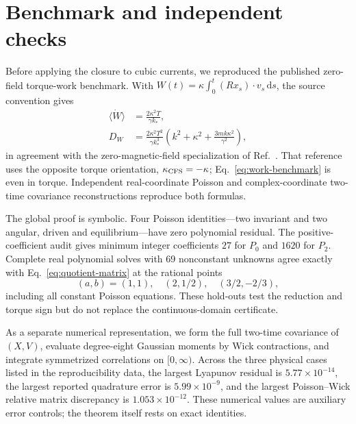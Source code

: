 \documentclass[aps,pre,reprint,amsmath,amssymb,superscriptaddress,nofootinbib]{revtex4-2}
\newcommand{\dd}{\mathrm{d}}
\begin{document}
\section{Benchmark and independent checks}
\label{sec:checks}

Before applying the closure to cubic currents, we reproduced the published
zero-field torque-work benchmark.  With
$W(t)=\kappa\int_0^t(Rx_s)\cdot v_s\,\dd s$, the source convention gives
\begin{subequations}
\label{eq:work-benchmark}
\begin{align}
 \langle\dot W\rangle&=\frac{2\kappa^2T}{\gamma k_*},\\
 D_W&=\frac{2\kappa^2T^2}{\gamma k_*^3}
 \left(k^2+\kappa^2+\frac{3mk\kappa^2}{\gamma^2}\right),
\end{align}
\end{subequations}
in agreement with the zero-magnetic-field specialization of
Ref.~\cite{ChunFischerSeifert2019}.  That reference uses the opposite torque
orientation, $\kappa_{\rm CFS}=-\kappa$; Eq.~\eqref{eq:work-benchmark} is even
in torque.  Independent real-coordinate Poisson and complex-coordinate
two-time covariance reconstructions reproduce both formulas.

The global proof is symbolic.  Four Poisson identities---two invariant and two
angular, driven and equilibrium---have zero polynomial residual.  The
positive-coefficient audit gives minimum integer coefficients $27$ for
$P_0$ and $1620$ for $P_2$.  Complete real polynomial solves with 69
nonconstant unknowns agree exactly with Eq.~\eqref{eq:quotient-matrix} at the
rational points
\begin{equation}
 (a,b)=(1,1),\quad(2,1/2),\quad(3/2,-2/3),
\end{equation}
including all constant Poisson equations.  These hold-outs test the reduction
and torque sign but do not replace the continuous-domain certificate.

As a separate numerical representation, we form the full two-time covariance
of $(X,V)$, evaluate degree-eight Gaussian moments by Wick contractions, and
integrate symmetrized correlations on $[0,\infty)$.  Across the three physical
cases listed in the reproducibility data, the largest Lyapunov residual is
$5.77\times10^{-14}$, the largest reported quadrature error is
$5.99\times10^{-9}$, and the largest Poisson--Wick relative matrix
discrepancy is $1.053\times10^{-12}$.  These numerical values are auxiliary
error controls; the theorem itself rests on exact identities.
\end{document}
